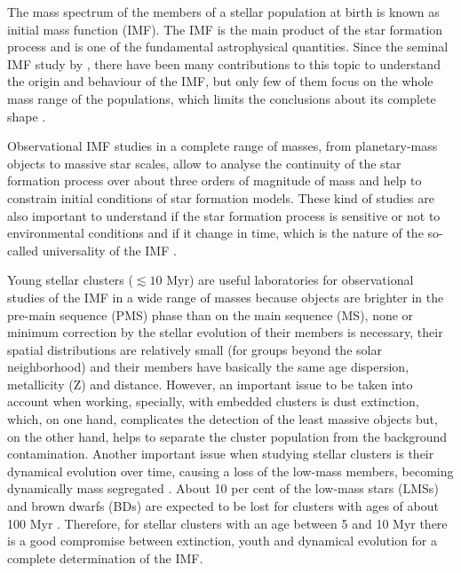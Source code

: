 \documentclass[12pt]{article}
\begin{document}
The mass spectrum of the members of a stellar population at birth is known as initial mass function (\ac{IMF}). The IMF is the main product of the star formation process and is one of the fundamental astrophysical quantities. Since the seminal IMF study by \citet{Salpeter1955}, there have been many contributions to this topic to understand the origin and behaviour of the IMF, but only few of them focus on the whole mass range of the populations, which limits the conclusions about its complete shape \cite[e.g.][and references therein]{Bastian2010}.

Observational IMF studies in a complete range of masses, from planetary-mass objects to massive star scales, allow to analyse the continuity of the star formation process over about three orders of magnitude of mass and help to constrain initial conditions of star formation models. These kind of studies are also important to understand if the star formation process is sensitive or not to environmental conditions and if it change in time, which is the nature of the so-called universality of the IMF \cite[e.g.][]{Kroupa2013,Offner2014}.

 Young stellar clusters ($\lesssim 10$ Myr) are useful laboratories for observational studies of the IMF in a wide range of masses because objects are brighter in the pre-main sequence (\ac{PMS}) phase than on the main sequence (\ac{MS}), none or minimum correction by the stellar evolution of their members is necessary, their spatial distributions are relatively small (for groups beyond the solar neighborhood) and their members have basically the same age dispersion, metallicity (\ac{Z}) and distance. However, an important issue to be taken into account when working, specially, with embedded clusters \citep[$\lesssim3$ Myr; ][]{Lada-Lada2003} is dust extinction, which, on one hand, complicates the detection of the least massive objects but, on the other hand, helps to separate the cluster population from the background contamination. Another important issue when studying stellar clusters is their dynamical evolution over time, causing a loss of the low-mass members, becoming dynamically mass segregated \citep[e.g., ][]{Elmegreen2000}. About 10 per cent of the low-mass stars (\ac{LMS}s) and brown dwarfs (\ac{BD}s) are expected to be lost for clusters with ages of about 100 Myr \citep{deLaFuenteMarcos-deLaFuenteMarcos2000}. Therefore, for stellar clusters with an age between 5 and 10 Myr there is a good compromise between extinction, youth and dynamical evolution for a complete determination of the IMF.
\end{document}
